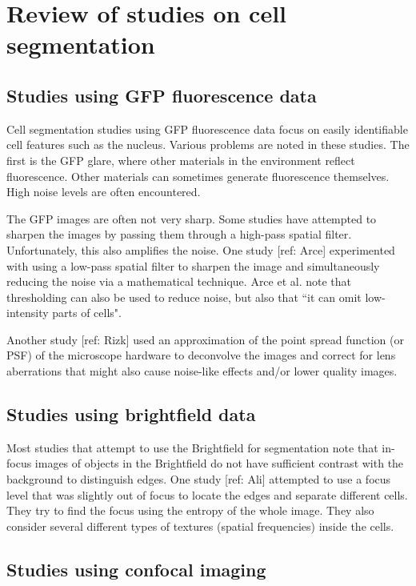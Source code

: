 \section{Review of studies on cell segmentation}

\subsection{Studies using GFP fluorescence data}

Cell segmentation studies using GFP fluorescence data focus on easily identifiable cell features such as the nucleus. Various problems are noted in these studies. The first is the GFP glare, where other materials in the environment reflect fluorescence. Other materials can sometimes generate fluorescence themselves. High noise levels are often encountered.

The GFP images are often not very sharp. Some studies have attempted to sharpen the images by passing them through a high-pass spatial filter. Unfortunately, this also amplifies the noise. One study [ref: Arce] experimented with using a low-pass spatial filter to sharpen the image and simultaneously reducing the noise via a mathematical technique. Arce et al. note that thresholding can also be used to reduce noise, but also that ``it can omit low-intensity parts of cells".

Another study [ref: Rizk] used an approximation of the point spread function (or PSF) of the microscope hardware to deconvolve the images and correct for lens aberrations that might also cause noise-like effects and/or lower quality images.

\subsection{Studies using brightfield data}

Most studies that attempt to use the Brightfield for segmentation note that in-focus images of objects in the Brightfield do not have sufficient contrast with the background to distinguish edges. One study [ref: Ali] attempted to use a focus level that was slightly out of focus to locate the edges and separate different cells. They try to find the focus using the entropy of the whole image. They also consider several different types of textures (spatial frequencies) inside the cells.

\subsection{Studies using confocal imaging}

